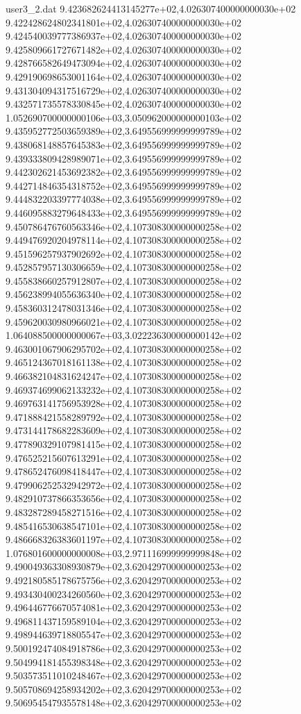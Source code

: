 \begin{filecontents}{user3_2.dat}
9.423682624413145277e+02,4.026307400000000030e+02
9.422428624802341801e+02,4.026307400000000030e+02
9.424540039777386937e+02,4.026307400000000030e+02
9.425809661727671482e+02,4.026307400000000030e+02
9.428766582649473094e+02,4.026307400000000030e+02
9.429190698653001164e+02,4.026307400000000030e+02
9.431304094317516729e+02,4.026307400000000030e+02
9.432571735578330845e+02,4.026307400000000030e+02
1.052690700000000106e+03,3.050962000000000103e+02
9.435952772503659389e+02,3.649556999999999789e+02
9.438068148857645383e+02,3.649556999999999789e+02
9.439333809428989071e+02,3.649556999999999789e+02
9.442302621453692382e+02,3.649556999999999789e+02
9.442714846354318752e+02,3.649556999999999789e+02
9.444832203397774038e+02,3.649556999999999789e+02
9.446095883279648433e+02,3.649556999999999789e+02
9.450786476760563346e+02,4.107308300000000258e+02
9.449476920204978114e+02,4.107308300000000258e+02
9.451596257937902692e+02,4.107308300000000258e+02
9.452857957130306659e+02,4.107308300000000258e+02
9.455838660257912807e+02,4.107308300000000258e+02
9.456238994055636340e+02,4.107308300000000258e+02
9.458360312478031346e+02,4.107308300000000258e+02
9.459620030980966021e+02,4.107308300000000258e+02
1.064088500000000067e+03,3.022236300000000142e+02
9.463001067906295702e+02,4.107308300000000258e+02
9.465124367018161138e+02,4.107308300000000258e+02
9.466382104831624247e+02,4.107308300000000258e+02
9.469374699062133232e+02,4.107308300000000258e+02
9.469763141756953928e+02,4.107308300000000258e+02
9.471888421558289792e+02,4.107308300000000258e+02
9.473144178682283609e+02,4.107308300000000258e+02
9.477890329107981415e+02,4.107308300000000258e+02
9.476525215607613291e+02,4.107308300000000258e+02
9.478652476098418447e+02,4.107308300000000258e+02
9.479906252532942972e+02,4.107308300000000258e+02
9.482910737866353656e+02,4.107308300000000258e+02
9.483287289458271516e+02,4.107308300000000258e+02
9.485416530638547101e+02,4.107308300000000258e+02
9.486668326383601197e+02,4.107308300000000258e+02
1.076801600000000008e+03,2.971116999999999848e+02
9.490049363308930879e+02,3.620429700000000253e+02
9.492180585178675756e+02,3.620429700000000253e+02
9.493430400234260560e+02,3.620429700000000253e+02
9.496446776670574081e+02,3.620429700000000253e+02
9.496811437159589104e+02,3.620429700000000253e+02
9.498944639718805547e+02,3.620429700000000253e+02
9.500192474084918786e+02,3.620429700000000253e+02
9.504994181455398348e+02,3.620429700000000253e+02
9.503573511010248467e+02,3.620429700000000253e+02
9.505708694258934202e+02,3.620429700000000253e+02
9.506954547935578148e+02,3.620429700000000253e+02

\end{filecontents}
